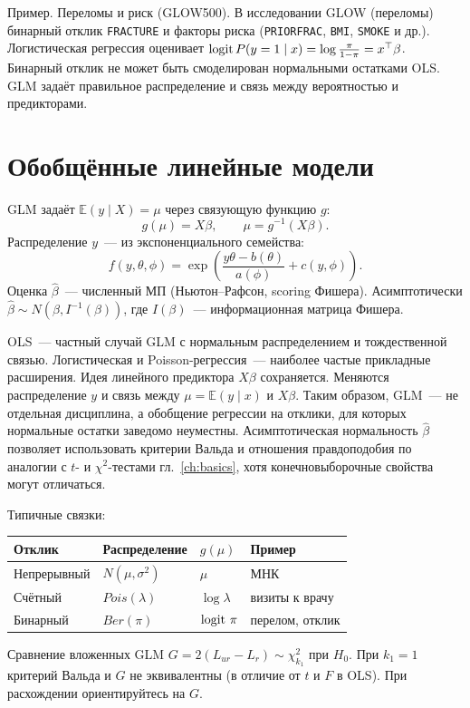 Пример. Переломы и риск (GLOW500). В исследовании GLOW (переломы) бинарный отклик \texttt{FRACTURE} и факторы риска (\texttt{PRIORFRAC}, \texttt{BMI}, \texttt{SMOKE} и др.).
Логистическая регрессия оценивает $\operatorname{logit} P(y=1\mid x)=\log\frac{\pi}{1-\pi}=x^\top\beta$.
Бинарный отклик не может быть смоделирован нормальными остатками OLS. GLM задаёт правильное распределение и связь между вероятностью и предикторами.

\section{Обобщённые линейные модели}
\label{sec:glm-ch5}

\begin{definition}
GLM задаёт $\mathbb{E}(y\mid X)=\mu$ через связующую функцию $g$:
\[ g(\mu)=X\beta, \qquad \mu=g^{-1}(X\beta).
\]
Распределение $y$~--- из экспоненциального семейства:
\[ f(y,\theta,\phi)=\exp\!\left(\frac{y\theta-b(\theta)}{a(\phi)}+c(y,\phi)\right).
\]
Оценка $\hat\beta$~--- численный МП (Ньютон--Рафсон, scoring Фишера). Асимптотически $\hat\beta\sim N(\beta,I^{-1}(\beta))$, где $I(\beta)$~--- информационная матрица Фишера.
\end{definition}

OLS~--- частный случай GLM с нормальным распределением и тождественной связью. Логистическая и Poisson-регрессия~--- наиболее частые прикладные расширения.
Идея линейного предиктора $X\beta$ сохраняется. Меняются распределение $y$ и связь между $\mu=\mathbb{E}(y\mid x)$ и $X\beta$.
Таким образом, GLM~--- не отдельная дисциплина, а обобщение регрессии на отклики, для которых нормальные остатки заведомо неуместны.
Асимптотическая нормальность $\hat\beta$ позволяет использовать критерии Вальда и отношения правдоподобия по аналогии с $t$- и $\chi^2$-тестами гл.~\ref{ch:basics}, хотя конечновыборочные свойства могут отличаться.

Типичные связки:
\begin{center}
\footnotesize
\begin{tabularx}{\linewidth}{@{}>{\raggedright\arraybackslash}X>{\raggedright\arraybackslash}X>{\raggedright\arraybackslash}X>{\raggedright\arraybackslash}X@{}}
\toprule
Отклик & Распределение & $g(\mu)$ & Пример \\
\midrule
Непрерывный & $N(\mu,\sigma^2)$ & $\mu$ & МНК \\
Счётный & $Pois(\lambda)$ & $\log\lambda$ & визиты к врачу \\
Бинарный & $Ber(\pi)$ & $\operatorname{logit}\,\pi$ & перелом, отклик \\
\bottomrule
\end{tabularx}
\end{center}
Сравнение вложенных GLM $G=2(L_{ur}-L_r)\sim\chi^2_{k_1}$ при $H_0$.
При $k_1=1$ критерий Вальда и $G$ не эквивалентны (в отличие от $t$ и $F$ в OLS). При расхождении ориентируйтесь на $G$.

